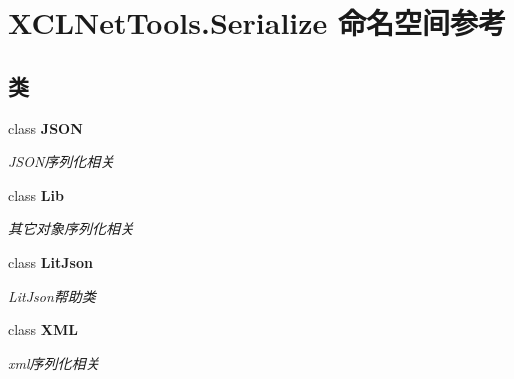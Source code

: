 \hypertarget{namespace_x_c_l_net_tools_1_1_serialize}{}\section{X\+C\+L\+Net\+Tools.\+Serialize 命名空间参考}
\label{namespace_x_c_l_net_tools_1_1_serialize}
\subsection*{类}
\begin{DoxyCompactItemize}
\item 
class {\bfseries J\+S\+ON}
\begin{DoxyCompactList}\small\item\em J\+S\+O\+N序列化相关 \end{DoxyCompactList}\item 
class {\bfseries Lib}
\begin{DoxyCompactList}\small\item\em 其它对象序列化相关 \end{DoxyCompactList}\item 
class {\bfseries Lit\+Json}
\begin{DoxyCompactList}\small\item\em Lit\+Json帮助类 \end{DoxyCompactList}\item 
class {\bfseries X\+ML}
\begin{DoxyCompactList}\small\item\em xml序列化相关 \end{DoxyCompactList}\end{DoxyCompactItemize}
